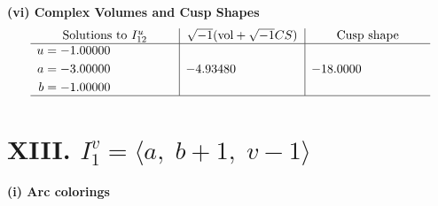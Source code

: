 \documentclass[1p]{elsarticle_modified}
\theoremstyle{definition}
\newcommand{\I}{\sqrt{-1}}
\begin{document}
\newpage\flushleft \textbf{(vi) Complex Volumes and Cusp Shapes}
$$\begin{array}{c|c|c}  
\text{Solutions to }I^u_{12}& \I (\text{vol} + \sqrt{-1}CS) & \text{Cusp shape}\\
 \hline 
\begin{aligned}
u &= -1.00000\phantom{ +0.000000I} \\
a &= -3.00000\phantom{ +0.000000I} \\
b &= -1.00000\phantom{ +0.000000I}\end{aligned}
 & -4.93480\phantom{ +0.000000I} & -18.0000\phantom{ +0.000000I}\\
 \hline 
 \end{array}$$\newpage\newpage\renewcommand{\arraystretch}{1}
\centering \section*{XIII. $I^v_{1}= \langle a,\;b+1,\;v-1 \rangle$}
\flushleft \textbf{(i) Arc colorings}\\
\end{document}
